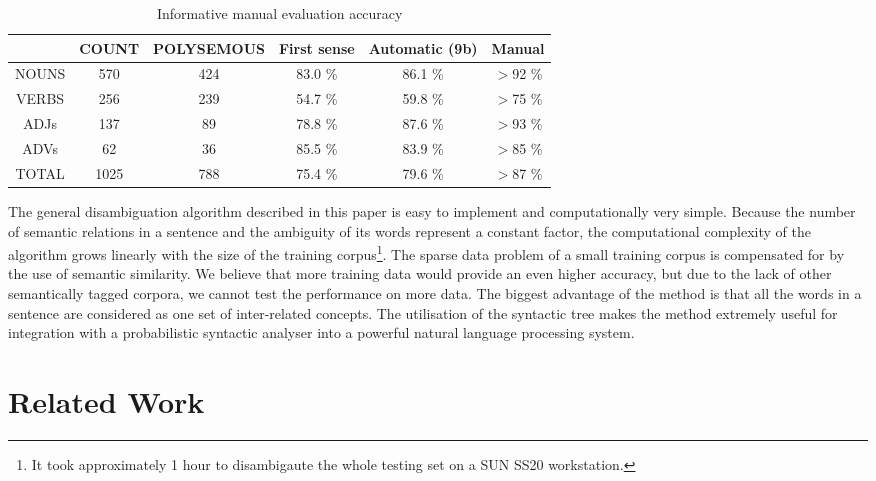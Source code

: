 \begin{table}[t]
  \leavevmode
    \caption{Informative manual evaluation accuracy }
    \label{tab:7}
  \begin{center}
\begin{tabular}[c]{|c|c|c|c|c|c|}\hline
 & COUNT & POLYSEMOUS & First sense & Automatic (9b) & Manual \\\hline
 NOUNS & 570 & 424 & 83.0 \% & 86.1 \% & $>$92 \% \\\hline
 VERBS & 256 & 239 & 54.7 \% & 59.8 \% & $>$75 \% \\\hline
 ADJs & 137 & 89 & 78.8 \% & 87.6 \% & $>$93 \% \\\hline
 ADVs & 62 & 36 & 85.5 \% & 83.9 \% & $>$85 \% \\\hline
 TOTAL & 1025 & 788 & 75.4 \% & 79.6 \% & $>$87 \%\\\hline
\end{tabular}
\end{center}
\end{table}


The general disambiguation algorithm described in this paper is easy to implement and computationally very simple. Because the number of semantic relations in a sentence and the ambiguity of its words represent a constant factor, the computational complexity of the algorithm grows linearly with the size of the training corpus\footnote{
It took approximately 1 hour to disambigaute the whole testing set on a SUN SS20 workstation.
}. The sparse data problem of a small training corpus is compensated for by the use of semantic similarity. We believe that more training data would provide an even higher accuracy, but due to the lack of other semantically tagged corpora, we cannot test the performance on more data. The biggest advantage of the method is that all the words in a sentence are considered as one set of inter-related concepts. The utilisation of the syntactic tree makes the method extremely useful for integration with a probabilistic syntactic analyser into a powerful natural language processing system.

\section{Related Work}

